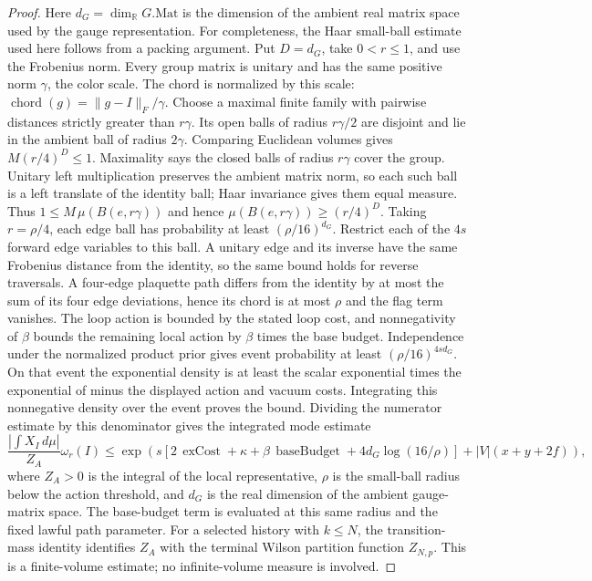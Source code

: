 \begin{proof}
Here $d_G=\dim_{\mathbb R}G.\mathrm{Mat}$ is the dimension of the ambient real matrix space used by the gauge representation. For completeness, the Haar small-ball estimate used here follows from a packing argument. Put $D=d_G$, take $0<r\leq1$, and use the Frobenius norm. Every group matrix is unitary and has the same positive norm $\gamma$, the color scale. The chord is normalized by this scale: $\operatorname{chord}(g)=\|g-I\|_F/\gamma$. Choose a maximal finite family with pairwise distances strictly greater than $r\gamma$. Its open balls of radius $r\gamma/2$ are disjoint and lie in the ambient ball of radius $2\gamma$. Comparing Euclidean volumes gives $M(r/4)^D\leq1$. Maximality says the closed balls of radius $r\gamma$ cover the group. Unitary left multiplication preserves the ambient matrix norm, so each such ball is a left translate of the identity ball; Haar invariance gives them equal measure. Thus $1\leq M\,\mu(B(e,r\gamma))$ and hence $\mu(B(e,r\gamma))\geq(r/4)^D$. Taking $r=\rho/4$, each edge ball has probability at least $(\rho/16)^{d_G}$. Restrict each of the $4s$ forward edge variables to this ball. A unitary edge and its inverse have the same Frobenius distance from the identity, so the same bound holds for reverse traversals. A four-edge plaquette path differs from the identity by at most the sum of its four edge deviations, hence its chord is at most $\rho$ and the flag term vanishes. The loop action is bounded by the stated loop cost, and nonnegativity of $\beta$ bounds the remaining local action by $\beta$ times the base budget. Independence under the normalized product prior gives event probability at least $(\rho/16)^{4s d_G}$. On that event the exponential density is at least the scalar exponential times the exponential of minus the displayed action and vacuum costs. Integrating this nonnegative density over the event proves the bound. Dividing the numerator estimate by this denominator gives the integrated mode estimate
\begin{equation}\label{ex-centered-sail}
 \frac{\left|\int X_I\,d\mu\right|}{Z_A}\omega_r(I)
 \leq \exp\!\left(s\left[2\,\operatorname{exCost}+\kappa+\beta\,\operatorname{baseBudget}
       +4d_G\log(16/\rho)\right]+|V|(x+y+2f)\right),
\end{equation}
where $Z_A>0$ is the integral of the local representative, $\rho$ is the small-ball radius below the action threshold, and $d_G$ is the real dimension of the ambient gauge-matrix space. The base-budget term is evaluated at this same radius and the fixed lawful path parameter. For a selected history with $k\leq N$, the transition-mass identity identifies $Z_A$ with the terminal Wilson partition function $Z_{N,p}$. This is a finite-volume estimate; no infinite-volume measure is involved.


\end{proof}
